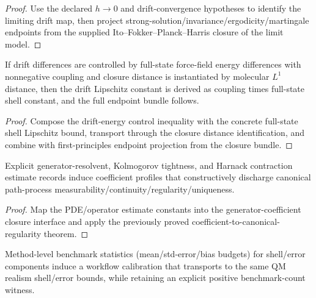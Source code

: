 \begin{proof}
Use the declared $h\to0$ and drift-convergence hypotheses to identify the limiting drift map, then project strong-solution/invariance/ergodicity/martingale endpoints from the supplied Ito--Fokker--Planck--Harris closure of the limit model.
\end{proof}

\begin{theorem}\label{thm:forcefield-derived-realistic-sde-endpoints}
If drift differences are controlled by full-state force-field energy differences with nonnegative coupling and closure distance is instantiated by molecular $L^1$ distance, then the drift Lipschitz constant is derived as coupling times full-state shell constant, and the full endpoint bundle follows.
\end{theorem}

\begin{proof}
Compose the drift-energy control inequality with the concrete full-state shell Lipschitz bound, transport through the closure distance identification, and combine with first-principles endpoint projection from the closure bundle.
\end{proof}

\begin{theorem}\label{thm:generator-pde-estimate-canonical-regularity-closure}
Explicit generator-resolvent, Kolmogorov tightness, and Harnack contraction estimate records induce coefficient profiles that constructively discharge canonical path-process measurability/continuity/regularity/uniqueness.
\end{theorem}

\begin{proof}
Map the PDE/operator estimate constants into the generator-coefficient closure interface and apply the previously proved coefficient-to-canonical-regularity theorem.
\end{proof}

\begin{theorem}\label{thm:qm-workflow-transport-benchmark-summary}
Method-level benchmark statistics (mean/std-error/bias budgets) for shell/error components induce a workflow calibration that transports to the same QM realism shell/error bounds, while retaining an explicit positive benchmark-count witness.
\end{theorem}

